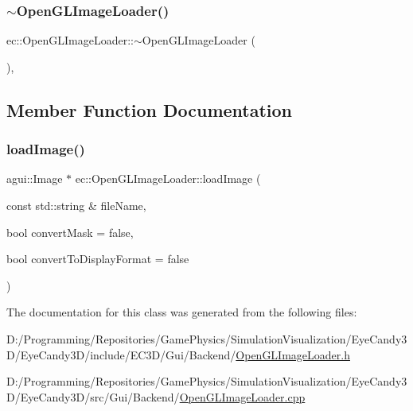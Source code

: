 \subsubsection{\texorpdfstring{$\sim$\+Open\+G\+L\+Image\+Loader()}{~OpenGLImageLoader()}}
{\footnotesize\ttfamily ec\+::\+Open\+G\+L\+Image\+Loader\+::$\sim$\+Open\+G\+L\+Image\+Loader (\begin{DoxyParamCaption}{ }\end{DoxyParamCaption})\hspace{0.3cm}{\ttfamily [virtual]}, {\ttfamily [default]}}



\subsection{Member Function Documentation}
\mbox{\label{classec_1_1_open_g_l_image_loader_a0e552f6d59a9fe5fd9208d7c664e67b7}} 
\subsubsection{\texorpdfstring{load\+Image()}{loadImage()}}
{\footnotesize\ttfamily agui\+::\+Image $\ast$ ec\+::\+Open\+G\+L\+Image\+Loader\+::load\+Image (\begin{DoxyParamCaption}\item[{const std\+::string \&}]{file\+Name,  }\item[{bool}]{convert\+Mask = {\ttfamily false},  }\item[{bool}]{convert\+To\+Display\+Format = {\ttfamily false} }\end{DoxyParamCaption})\hspace{0.3cm}{\ttfamily [override]}}



The documentation for this class was generated from the following files\+:\begin{DoxyCompactItemize}
\item 
D\+:/\+Programming/\+Repositories/\+Game\+Physics/\+Simulation\+Visualization/\+Eye\+Candy3\+D/\+Eye\+Candy3\+D/include/\+E\+C3\+D/\+Gui/\+Backend/\mbox{\hyperlink{_open_g_l_image_loader_8h}{Open\+G\+L\+Image\+Loader.\+h}}\item 
D\+:/\+Programming/\+Repositories/\+Game\+Physics/\+Simulation\+Visualization/\+Eye\+Candy3\+D/\+Eye\+Candy3\+D/src/\+Gui/\+Backend/\mbox{\hyperlink{_open_g_l_image_loader_8cpp}{Open\+G\+L\+Image\+Loader.\+cpp}}\end{DoxyCompactItemize}

